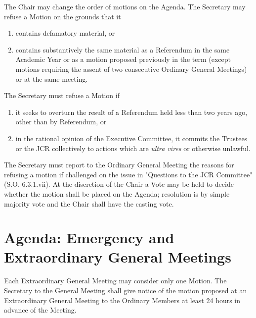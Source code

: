 \npara The Chair may change the order of motions on the Agenda.
\npara\label{gm:optional_refusal} The Secretary may refuse a Motion on the grounds that it 
\begin{enumerate}
    \item contains defamatory material, or
    \item contains substantively the same material as a Referendum in the same Academic Year or as a motion proposed previously in the term (except motions requiring the assent of two consecutive Ordinary General Meetings) or at the same meeting.
\end{enumerate}
\npara\label{gm:obligatory_refusal} The Secretary must refuse a Motion if 
\begin{enumerate}
    \item it seeks to overturn the result of a Referendum held less than two years ago, other than by Referendum, or
    \item in the rational opinion of the Executive Committee, it commits the Trustees or the JCR collectively to actions which are \emph{ultra vires} or otherwise unlawful.
\end{enumerate} 
\npara The Secretary must report to the Ordinary General Meeting the reasons for refusing a motion if challenged on the issue in "Questions to the JCR Committee" (S.O. 6.3.1.vii). At the discretion of the Chair a Vote may be held to decide whether the motion shall be placed on the Agenda; resolution is by simple majority vote and the Chair shall have the casting vote.
\section{Agenda: Emergency and Extraordinary General Meetings}
\npara Each Extraordinary General Meeting may consider only one Motion.
\npara The Secretary to the General Meeting shall give notice of the motion proposed at an Extraordinary General Meeting to the Ordinary Members at least 24 hours in advance of the Meeting.
